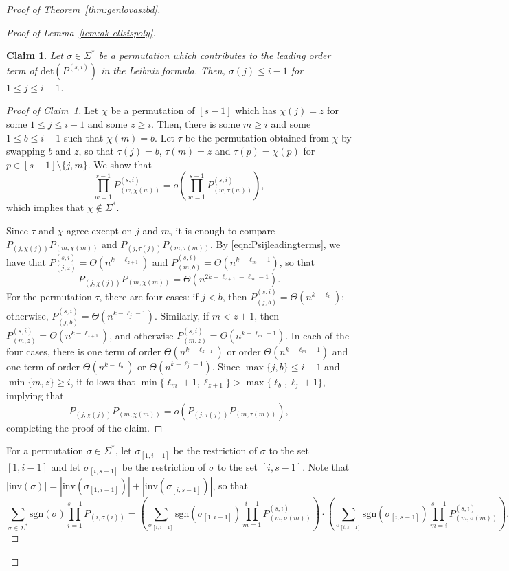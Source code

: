 \documentclass[11pt]{article}
\newtheorem{claim}[theorem]{Claim}
\theoremstyle{definition}
\theoremstyle{remark}
\begin{document}
\begin{proof}[Proof of Theorem~\ref{thm:genlovaszbd}]
\begin{proof}[Proof of Lemma~\ref{lem:ak-ellsispoly}]
\begin{claim}\label{Ps(s,i)clm}
Let $\sigma \in \Sigma^*$ be a permutation which contributes to the leading order term of $\text{det}(P^{(s, i)})$ in the Leibniz formula. Then, $\sigma(j) \le i-1$ for $1\le j\le i-1$. 
\end{claim} 

\begin{proof}[Proof of Claim~\ref{Ps(s,i)clm}]
Let $\chi$ be a permutation of $[s-1]$ which has $\chi(j) = z$ for some $1\le j\le i-1$ and some $z\ge i$. Then, there is some $m\ge i$ and some $1\le b\le i-1$ such that $\chi(m) = b$. Let $\tau$ be the permutation obtained from $\chi$ by swapping $b$ and $z$, so that $\tau(j) = b$, $\tau(m) = z$ and $\tau(p) = \chi(p)$ for $p\in [s-1]\setminus\{j, m\}$. We show that 
\[\prod_{w=1}^{s-1}P_{(w, \chi(w))}^{(s, i)} = o\left(\prod_{w=1}^{s-1}P_{(w, \tau(w))}^{(s, i)}\right),\]
which implies that $\chi \notin \Sigma^*$. 

Since $\tau$ and $\chi$ agree except on $j$ and $m$, it is enough to compare $P_{(j, \chi(j))}P_{(m, \chi(m))}$ and $P_{(j, \tau(j))}P_{(m, \tau(m))}$. By \eqref{eqn:Psijleadingterms}, we have that $P_{(j, z)}^{(s, i)} = \Theta(n^{k-\ell_{z+1}})$ and $P_{(m, b)}^{(s, i)} = \Theta(n^{k-\ell_m-1})$, so that
\[P_{(j, \chi(j))}P_{(m, \chi(m))} = \Theta(n^{2k-\ell_{z+1}-\ell_m-1}).\]
For the permutation $\tau$, there are four cases: if $j < b$, then $P_{(j, b)}^{(s, i)} = \Theta(n^{k-\ell_b})$; otherwise, $P_{(j, b)}^{(s, i)} = \Theta(n^{k-\ell_j-1})$. Similarly, if $m < z+1$, then $P_{(m, z)}^{(s, i)} = \Theta(n^{k-\ell_{z+1}})$, and otherwise $P_{(m, z)}^{(s, i)} = \Theta(n^{k-\ell_m-1})$. In each of the four cases, there is one term of order $\Theta(n^{k-\ell_{z+1}})$ or order $\Theta(n^{k-\ell_m-1})$ and one term of order $\Theta(n^{k-\ell_b})$ or $\Theta(n^{k-\ell_j-1})$. Since $\max\{j, b\} \le i-1$ and $\min\{m, z\} \ge i$, it follows that $\min\{\ell_m+1, \ell_{z+1}\} > \max\{\ell_b, \ell_j + 1\}$, implying that 
\[P_{(j, \chi(j))}P_{(m, \chi(m))} = o(P_{(j, \tau(j))}P_{(m, \tau(m))}),\]
completing the proof of the claim. 
\end{proof}

For a permutation $\sigma \in \Sigma^*$, let $\sigma_{[1, i-1]}$ be the restriction of $\sigma$ to the set $[1, i-1]$ and let $\sigma_{[i, s-1]}$ be the restriction of $\sigma$ to the set $[i, s-1]$. Note that $|\text{inv}(\sigma)| = |\text{inv}(\sigma_{[1, i-1]})| + |\text{inv}(\sigma_{[i, s-1]})|$, so that
\[\sum_{\sigma\in \Sigma^*}\text{sgn}(\sigma)\prod_{i=1}^{s-1}P_{(i, \sigma(i))} = \left(\sum_{\sigma_{[1, i-1]}}\text{sgn}(\sigma_{[1, i-1]})\prod_{m=1}^{i-1}P_{(m, \sigma(m))}^{(s, i)}\right)\cdot \left(\sum_{\sigma_{[i, s-1]}}\text{sgn}(\sigma_{[i, s-1]})\prod_{m=i}^{s-1}P_{(m, \sigma(m))}^{(s, i)}\right).\]


\end{proof}
\end{proof}
\end{document}
